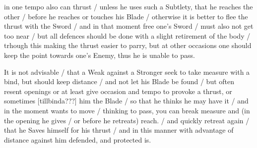 \newpage


\newpage


in one tempo also can thrust / unless he uses such a Subtlety, that he
reaches the other / before he reaches or touches his Blade / otherwise
it is better to flee the thrust with the Sword / and in that moment
free one's Sword / must also not get too near / but all defences
should be done with a slight retirement of the body / trhough this
making the thrust easier to parry, but at other occasions one should
keep the point towards one's Enemy, thus he is unable to pass.


It is not advisable / that a Weak against a Stronger seek to take
measure with a bind, but should keep distance / and not let his Blade
be found / but often resent openings or at least give occasion and
tempo to provoke a thrust, or sometimes
[tillbinda???] him the Blade / so that he thinks he may have it / and in the
moment wants to move / thinking to pass, you can break measure and (in
the opening he gives / or before he retreats) reach. / and quickly
retreat again / that he Saves himself for his thrust / and in this
manner with advantage of distance against him defended, and protected is.


